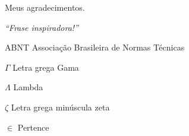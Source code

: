 \documentclass[
	12pt,				%
	openright,			%
	twoside,			%
	a4paper,			%
	english,			%
    french,             %
	spanish,			%
	brazil				%
	]{abntex2}
\begin{document}
\begin{agradecimentos}
	Meus agradecimentos.

\end{agradecimentos}

\begin{epigrafe}
	\vspace*{\fill}
	\begin{flushright}
		\textit{``Frase inspiradora!''}
	\end{flushright}
\end{epigrafe}






\listoffigures*
\cleardoublepage

\listoftables*
\cleardoublepage

\begin{siglas}
	\item[ABNT] Associação Brasileira de Normas Técnicas
\end{siglas}

\begin{simbolos}
	\item[$ \Gamma $] Letra grega Gama
	\item[$ \Lambda $] Lambda
	\item[$ \zeta $] Letra grega minúscula zeta
	\item[$ \in $] Pertence
\end{simbolos}

\tableofcontents*
\cleardoublepage

\textual







\end{document}
